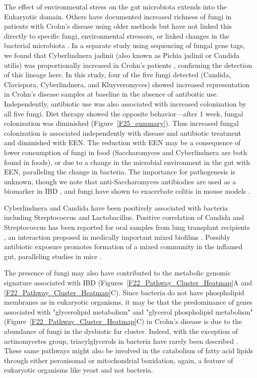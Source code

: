The effect of environmental stress on the gut microbiota extends into the Eukaryotic domain. Others have documented increased richness of fungi in patients with Crohn's disease using older methods but have not linked this directly to specific fungi, environmental stressors, or linked changes in the bacterial microbiota \citep{Ott:2008kj, Richard:2015kk}. In a separate study using sequencing of fungal gene tags, we found that Cyberlindnera jadinii (also known as Pichia jadinii or Candida utilis) was proportionally increased in Crohn's patients \citep{Chehoud:2015ga}, confirming the detection of this lineage here. In this study, four of the five fungi detected (Candida, Clavispora, Cyberlindnera, and Kluyveromyces) showed increased representation in Crohn's disease samples at baseline in the absence of antiboitic use. Independently, antibiotic use was also associated with increased colonization by all five fungi. Diet therapy showed the opposite behavior—after 1 week, fungal colonization was diminished (Figure~\ref{F25_summary}). Thus increased fungal colonization is associated independently with disease and antibiotic treatment and diminished with EEN. The reduction with EEN may be a consequence of lower consumption of fungi in food (Saccharomyces and Cyberlindnera are both found in foods), or due to a change in the microbial environment in the gut with EEN, paralleling the change in bacteria. The importance for pathogenesis is unknown, though we note that anti-Saccharomyces antibiodies are used as a biomarker in IBD \citep{Peeters:2001ba, Prideaux:2012kn, Quinton:1998tj}, and fungi have shown to exacerbate colitis in mouse models \citep{Iliev:2012ko}. 

Cyberlindnera and Candida have been positively associated with bacteria including Streptococcus and Lactobacillus. Positive correlation of Candida and Streptococcus has been reported for oral samples from lung transplant recipients \citep{Bittinger:2014hm}, an interaction proposed in medically important mixed biofilms \citep{Metwalli:2013fb}. Possibly antibiotic exposure promotes formation of a mixed community in the inflamed gut, paralleling studies in mice \citep{Dollive:2013cj}. 


The presence of fungi may also have contributed to the metabolic genomic signature associated with IBD (Figures~\ref{F22_Pathway_Cluster_Heatmap}A and \ref{F22_Pathway_Cluster_Heatmap}C). Since bacteria do not have phospholipid membranes as in eukaryotic organisms, it may be that the predominance of genes associated with "glycerolipid metabolism" and "glycerol phospholipid metabolism" (Figure~\ref{F22_Pathway_Cluster_Heatmap}C) in Crohn's disease is due to the abundance of fungi in the dysbiotic far cluster. Indeed, with the exception of actinomycetes group, triacylglycerols in bacteria have rarely been described \citep{Alvarez:2002cy}. These same pathways might also be involved in the catabolism of fatty acid lipids through either peroxisomal or mitochondrial boxidation, again, a feature of eukaryotic organisms like yeast \citep{Strijbis:2010gd} and not bacteria. 


